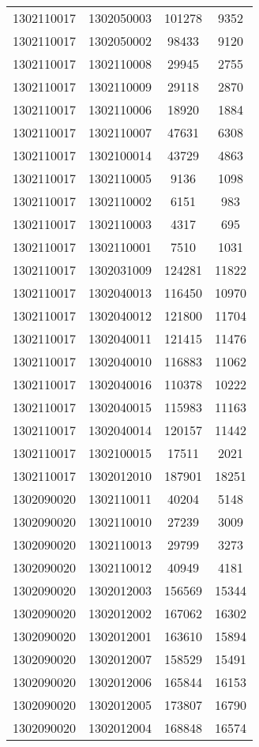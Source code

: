 \begin{longtable}{llcc}
1302110017 & 1302050003 & 101278 & 9352\\
1302110017 & 1302050002 & 98433 & 9120\\
1302110017 & 1302110008 & 29945 & 2755\\
1302110017 & 1302110009 & 29118 & 2870\\
1302110017 & 1302110006 & 18920 & 1884\\
1302110017 & 1302110007 & 47631 & 6308\\
1302110017 & 1302100014 & 43729 & 4863\\
1302110017 & 1302110005 & 9136 & 1098\\
1302110017 & 1302110002 & 6151 & 983\\
1302110017 & 1302110003 & 4317 & 695\\
1302110017 & 1302110001 & 7510 & 1031\\
1302110017 & 1302031009 & 124281 & 11822\\
1302110017 & 1302040013 & 116450 & 10970\\
1302110017 & 1302040012 & 121800 & 11704\\
1302110017 & 1302040011 & 121415 & 11476\\
1302110017 & 1302040010 & 116883 & 11062\\
1302110017 & 1302040016 & 110378 & 10222\\
1302110017 & 1302040015 & 115983 & 11163\\
1302110017 & 1302040014 & 120157 & 11442\\
1302110017 & 1302100015 & 17511 & 2021\\
1302110017 & 1302012010 & 187901 & 18251\\
1302090020 & 1302110011 & 40204 & 5148\\
1302090020 & 1302110010 & 27239 & 3009\\
1302090020 & 1302110013 & 29799 & 3273\\
1302090020 & 1302110012 & 40949 & 4181\\
1302090020 & 1302012003 & 156569 & 15344\\
1302090020 & 1302012002 & 167062 & 16302\\
1302090020 & 1302012001 & 163610 & 15894\\
1302090020 & 1302012007 & 158529 & 15491\\
1302090020 & 1302012006 & 165844 & 16153\\
1302090020 & 1302012005 & 173807 & 16790\\
1302090020 & 1302012004 & 168848 & 16574\\

\end{longtable}
